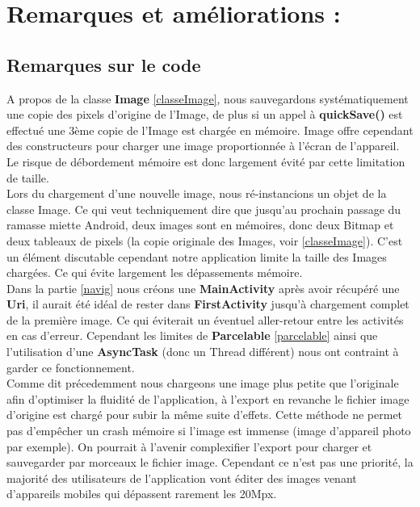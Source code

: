 \section{Remarques et améliorations  :}

\subsection{Remarques sur le code}
A propos de la classe \textbf{Image} \ref{classeImage}, nous sauvegardons systématiquement une copie des pixels d'origine de l'Image, de plus si un appel à \textbf{quickSave()} est effectué une 3ème copie de l'Image est chargée en mémoire. Image offre cependant des constructeurs pour charger une image proportionnée à l'écran de l'appareil. Le risque de débordement mémoire est donc largement évité par cette limitation de taille.
\\

Lors du chargement d'une nouvelle image, nous ré-instancions un objet de la classe Image. Ce qui veut techniquement dire que jusqu'au prochain passage du ramasse miette Android, deux images sont en mémoires, donc deux Bitmap et deux tableaux de pixels (la copie originale des Images, voir \ref{classeImage}). C'est un élément discutable cependant notre application limite la taille des Images chargées. Ce qui évite largement les dépassements mémoire.
\\

Dans la partie \ref{navig} nous créons une \textbf{MainActivity} après avoir récupéré une \textbf{Uri}, il aurait été idéal de rester dans \textbf{FirstActivity} jusqu'à chargement complet de la première image. Ce qui éviterait un éventuel aller-retour entre les activités en cas d'erreur. Cependant les limites de \textbf{Parcelable} \ref{parcelable} ainsi que l'utilisation d'une \textbf{AsyncTask} (donc un Thread différent) nous ont contraint à garder ce fonctionnement.
\\

Comme dit précedemment nous chargeons une image plus petite que l'originale afin d'optimiser la fluidité de l'application, à l'export en revanche le fichier image d'origine est chargé pour subir la même suite d'effets. Cette méthode ne permet pas d'empêcher un crash mémoire si l'image est immense (image d'appareil photo par exemple). On pourrait à l'avenir complexifier l'export pour charger et sauvegarder par morceaux le fichier image. Cependant ce n'est pas une priorité, la majorité des utilisateurs de l'application vont éditer des images venant d'appareils mobiles qui dépassent rarement les 20Mpx.
\\


